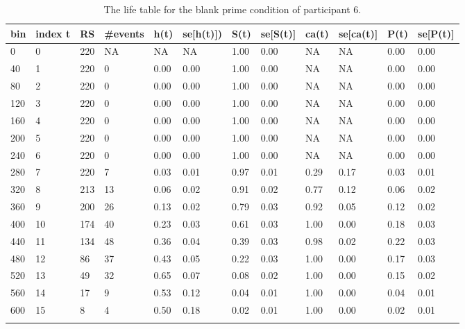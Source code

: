 \documentclass[
  man, donotrepeattitle,floatsintext]{apa6}
\begin{document}
\begin{table}[H]

\begin{center}
\begin{threeparttable}

\caption{\label{tab:life-table}The life table for the blank prime condition of participant 6.}

\begin{tabular}{llllllllllll}
\toprule
bin & \multicolumn{1}{c}{index t} & \multicolumn{1}{c}{RS} & \multicolumn{1}{c}{\#events} & \multicolumn{1}{c}{h(t)} & \multicolumn{1}{c}{se[h(t)])} & \multicolumn{1}{c}{S(t)} & \multicolumn{1}{c}{se[S(t)]} & \multicolumn{1}{c}{ca(t)} & \multicolumn{1}{c}{se[ca(t)]} & \multicolumn{1}{c}{P(t)} & \multicolumn{1}{c}{se[P(t)]}\\
\midrule
0 & 0 & 220 & NA & NA & NA & 1.00 & 0.00 & NA & NA & 0.00 & 0.00\\
40 & 1 & 220 & 0 & 0.00 & 0.00 & 1.00 & 0.00 & NA & NA & 0.00 & 0.00\\
80 & 2 & 220 & 0 & 0.00 & 0.00 & 1.00 & 0.00 & NA & NA & 0.00 & 0.00\\
120 & 3 & 220 & 0 & 0.00 & 0.00 & 1.00 & 0.00 & NA & NA & 0.00 & 0.00\\
160 & 4 & 220 & 0 & 0.00 & 0.00 & 1.00 & 0.00 & NA & NA & 0.00 & 0.00\\
200 & 5 & 220 & 0 & 0.00 & 0.00 & 1.00 & 0.00 & NA & NA & 0.00 & 0.00\\
240 & 6 & 220 & 0 & 0.00 & 0.00 & 1.00 & 0.00 & NA & NA & 0.00 & 0.00\\
280 & 7 & 220 & 7 & 0.03 & 0.01 & 0.97 & 0.01 & 0.29 & 0.17 & 0.03 & 0.01\\
320 & 8 & 213 & 13 & 0.06 & 0.02 & 0.91 & 0.02 & 0.77 & 0.12 & 0.06 & 0.02\\
360 & 9 & 200 & 26 & 0.13 & 0.02 & 0.79 & 0.03 & 0.92 & 0.05 & 0.12 & 0.02\\
400 & 10 & 174 & 40 & 0.23 & 0.03 & 0.61 & 0.03 & 1.00 & 0.00 & 0.18 & 0.03\\
440 & 11 & 134 & 48 & 0.36 & 0.04 & 0.39 & 0.03 & 0.98 & 0.02 & 0.22 & 0.03\\
480 & 12 & 86 & 37 & 0.43 & 0.05 & 0.22 & 0.03 & 1.00 & 0.00 & 0.17 & 0.03\\
520 & 13 & 49 & 32 & 0.65 & 0.07 & 0.08 & 0.02 & 1.00 & 0.00 & 0.15 & 0.02\\
560 & 14 & 17 & 9 & 0.53 & 0.12 & 0.04 & 0.01 & 1.00 & 0.00 & 0.04 & 0.01\\
600 & 15 & 8 & 4 & 0.50 & 0.18 & 0.02 & 0.01 & 1.00 & 0.00 & 0.02 & 0.01\\
\bottomrule
\addlinespace
\end{tabular}


\end{threeparttable}
\end{center}
\end{table}
\end{document}
